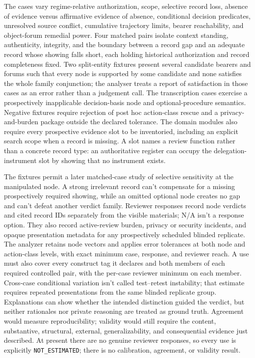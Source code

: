 The cases vary regime-relative authorization, scope, selective record loss, absence of evidence versus affirmative evidence of absence, conditional decision predicates, unresolved source conflict, cumulative trajectory limits, bearer reachability, and object-forum remedial power. Four matched pairs isolate context standing, authenticity, integrity, and the boundary between a record gap and an adequate record whose showing falls short, each holding historical authorization and record completeness fixed. Two split-entity fixtures present several candidate bearers and forums such that every node is supported by some candidate and none satisfies the whole family conjunction; the analyser treats a report of satisfaction in those cases as an error rather than a judgement call. The transcription cases exercise a prospectively inapplicable decision-basis node and optional-procedure semantics. Negative fixtures require rejection of post hoc action-class rescue and a privacy-and-burden package outside the declared tolerance. The domain modules also require every prospective evidence slot to be inventoried, including an explicit search scope when a record is missing. A slot names a review function rather than a concrete record type: an authoritative register can occupy the delegation-instrument slot by showing that no instrument exists.

The fixtures permit a later matched-case study of selective sensitivity at the manipulated node. A strong irrelevant record can't compensate for a missing prospectively required showing, while an omitted optional node creates no gap and can't defeat another verdict family. Reviewer responses record node verdicts and cited record IDs separately from the visible materials; N/A isn't a response option. They also record active-review burden, privacy or security incidents, and opaque presentation metadata for any prospectively scheduled blinded replicate. The analyzer retains node vectors and applies error tolerances at both node and action-class levels, with exact minimum case, response, and reviewer reach. A use must also cover every construct tag it declares and both members of each required controlled pair, with the per-case reviewer minimum on each member. Cross-case conditional variation isn't called test--retest instability; that estimate requires repeated presentations from the same blinded replicate group. Explanations can show whether the intended distinction guided the verdict, but neither rationales nor private reasoning are treated as ground truth. Agreement would measure reproducibility; validity would still require the content, substantive, structural, external, generalizability, and consequential evidence just described. At present there are no genuine reviewer responses, so every use is explicitly \texttt{NOT\_ESTIMATED}; there is no calibration, agreement, or validity result.


